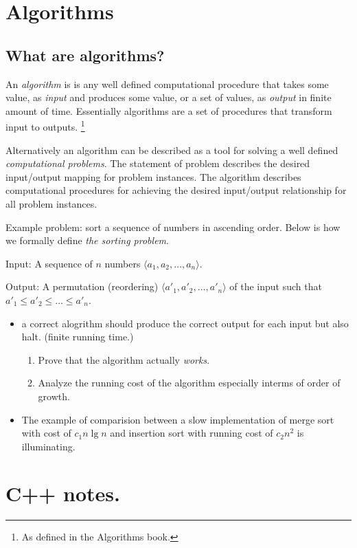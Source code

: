 \documentclass[a4paper]{article}
\begin{document}
\section*{Algorithms}

\subsection*{What are algorithms?}

An \emph{algorithm} is is any well defined computational procedure that takes some value, as \emph{input} and produces some value, 
or a set of values, as \emph{output} in finite amount of time. Essentially algorithms are a set of procedures that transform input to outputs.
\footnote{As defined in the Algorithms book.}

Alternatively an algorithm can be described as a tool for solving a well defined \emph{computational problems}. The statement of problem describes
the desired input/output mapping for problem instances. The algorithm describes computational procedures for achieving the desired input/output relationship
for all problem instances.

Example problem: sort a sequence of numbers in ascending order. Below is how we formally define \emph{the sorting problem}.

Input: A sequence of \(n\) numbers \(\langle a_1, a_2, \ldots, a_n\rangle\). 

Output: A permutation (reordering) \(\langle a'_1, a'_2, \ldots, a'_n\rangle\) of the input such that \(a'_1 \leq a'_2 \leq \ldots \leq a'_n\).

\begin{itemize}
    \item a correct alogrithm should produce the correct output for each input but also halt. (finite running time.)
          \begin{enumerate}
              \item Prove that the algorithm actually \emph{works}.
              \item Analyze the running cost of the algorithm especially interms of order of growth.
          \end{enumerate}
    \item The example of comparision between a slow implementation of merge sort with cost of \(c_1n\lg{n}\) and insertion sort with running cost of
          \(c_2n^2\) is illuminating.
\end{itemize}

\section*{C++ notes.}
\end{document}
